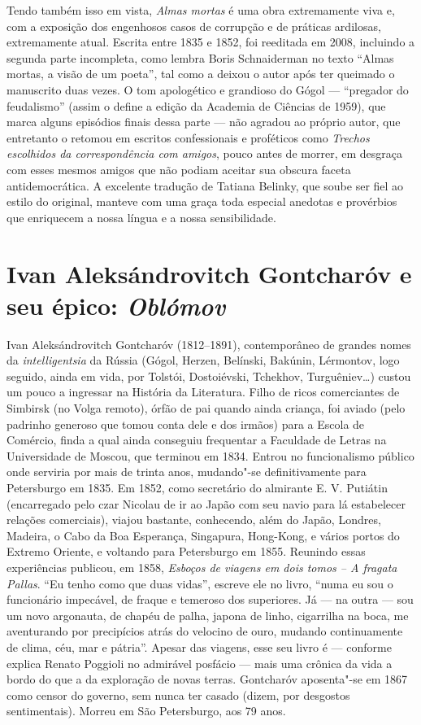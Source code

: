 Tendo também isso em vista, \emph{Almas mortas} é uma
obra extremamente viva e, com a exposição dos engenhosos casos de
corrupção e de práticas ardilosas, extremamente atual. Escrita entre
1835 e 1852, foi reeditada em 2008, incluindo a segunda parte incompleta,
como lembra Boris Schnaiderman no texto ``Almas mortas, a visão de um
poeta'', tal como a deixou o autor após ter queimado o manuscrito duas
vezes. O tom apologético e grandioso do Gógol --- ``pregador do
feudalismo'' (assim o define a edição da Academia de Ciências de 1959),
que marca alguns episódios finais dessa parte --- não agradou ao próprio
autor, que entretanto o retomou em escritos confessionais e proféticos
como \emph{Trechos escolhidos da correspondência com amigos}, pouco antes de
morrer, em desgraça com esses mesmos amigos que não podiam aceitar sua
obscura faceta antidemocrática. A excelente tradução de Tatiana Belinky,
que soube ser fiel ao estilo do original, manteve com uma graça toda
especial anedotas e provérbios que enriquecem a nossa língua e a nossa
sensibilidade.

\chapter{Ivan Aleksándrovitch Gontcharóv e seu épico: \emph{Oblómov}}

Ivan Aleksándrovitch Gontcharóv (1812--1891), contemporâneo de grandes nomes  da \emph{intelligentsia} da Rússia (Gógol, Herzen, Belínski, Bakúnin, Lérmontov, logo seguido, ainda em vida, por Tolstói, Dostoiévski, Tchekhov, Turguêniev\ldots{}) custou um pouco a ingressar na História da Literatura. Filho de ricos comerciantes de Simbirsk (no Volga remoto), órfão de pai quando ainda criança, foi aviado (pelo padrinho generoso que tomou conta dele e dos irmãos) para a Escola de Comércio, finda a qual ainda conseguiu frequentar a Faculdade de Letras na Universidade de Moscou, que terminou em 1834. Entrou no funcionalismo público onde serviria por mais de trinta anos, mudando"-se definitivamente para Petersburgo em 1835. Em 1852, como secretário do almirante E. V. Putiátin (encarregado pelo czar Nicolau  de ir ao Japão com seu navio para lá estabelecer relações comerciais), viajou bastante, conhecendo, além do Japão, Londres, Madeira, o Cabo da Boa Esperança, Singapura, Hong-Kong, e vários portos do Extremo Oriente, e voltando  para Petersburgo em 1855. Reunindo essas experiências publicou, em 1858,  \emph{Esboços de viagens em dois tomos -- A fragata Pallas}. ``Eu tenho como que duas vidas'', escreve ele no livro, ``numa eu sou o funcionário impecável, de fraque e temeroso dos superiores. Já --- na outra --- sou um novo argonauta, de chapéu de palha, japona de linho, cigarrilha na boca, me aventurando por precipícios atrás do velocino de ouro, mudando continuamente de clima, céu, mar e pátria''. Apesar das viagens, esse seu livro é --- conforme explica Renato Poggioli no admirável posfácio --- mais uma crônica da vida a bordo do que a da exploração de novas terras. Gontcharóv aposenta"-se em 1867 como censor do governo, sem nunca ter casado (dizem, por desgostos sentimentais). Morreu em São Petersburgo, aos 79 anos. 

